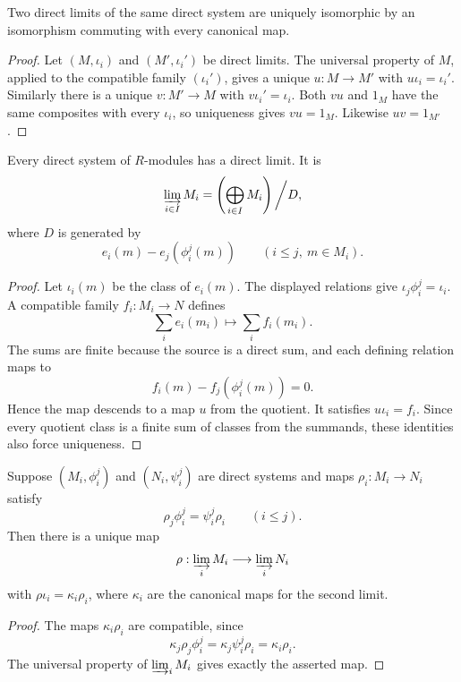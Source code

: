\begin{proposition}
Two direct limits of the same direct system are uniquely isomorphic by an
isomorphism commuting with every canonical map.
\end{proposition}
\begin{proof}
Let \((M,\iota_i)\) and \((M',\iota_i')\) be direct limits.  The universal
property of \(M\), applied to the compatible family \((\iota_i')\), gives a
unique \(u:M\to M'\) with \(u\iota_i=\iota_i'\).  Similarly there is a unique
\(v:M'\to M\) with \(v\iota_i'=\iota_i\).  Both \(vu\) and \(1_M\) have the
same composites with every \(\iota_i\), so uniqueness gives \(vu=1_M\).
Likewise \(uv=1_{M'}\).
\end{proof}

\begin{proposition}
Every direct system of \(R\)-modules has a direct limit.  It is
\[
\varinjlim_{i\in I}M_i=
\left(\bigoplus_{i\in I}M_i\right)\bigg/D,
\]
where \(D\) is generated by
\[
e_i(m)-e_j(\phi_i^j(m))\qquad(i\leq j,\ m\in M_i).
\]
\end{proposition}
\begin{proof}
Let \(\iota_i(m)\) be the class of \(e_i(m)\).  The displayed relations give
\(\iota_j\phi_i^j=\iota_i\).  A compatible family \(f_i:M_i\to N\) defines
\[
\sum_i e_i(m_i)\longmapsto\sum_i f_i(m_i).
\]
The sums are finite because the source is a direct sum, and each defining
relation maps to
\[
f_i(m)-f_j(\phi_i^j(m))=0.
\]
Hence the map descends to a map \(u\) from the quotient.  It satisfies
\(u\iota_i=f_i\).  Since every quotient class is a finite sum of classes from
the summands, these identities also force uniqueness.
\end{proof}

\begin{proposition}\label{prop:direct-limit-maps}
Suppose \((M_i,\phi_i^j)\) and \((N_i,\psi_i^j)\) are direct systems and maps
\(\rho_i:M_i\to N_i\) satisfy
\[
\rho_j\phi_i^j=\psi_i^j\rho_i
\qquad(i\leq j).
\]
Then there is a unique map
\[
\rho:\varinjlim_iM_i\longrightarrow\varinjlim_iN_i
\]
with \(\rho\iota_i=\kappa_i\rho_i\), where \(\kappa_i\) are the canonical maps
for the second limit.
\end{proposition}
\begin{proof}
The maps \(\kappa_i\rho_i\) are compatible, since
\[
\kappa_j\rho_j\phi_i^j
=\kappa_j\psi_i^j\rho_i
=\kappa_i\rho_i.
\]
The universal property of \(\varinjlim_iM_i\) gives exactly the asserted map.
\end{proof}

